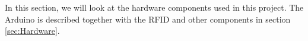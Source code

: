In this section, we will look at the hardware components used in this project. The Arduino is described together with the RFID and other components in section \ref{sec:Hardware}.